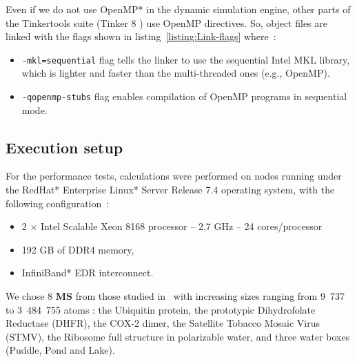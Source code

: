 \documentclass[9pt,comparison]{livecoms}
\newcommand{\lv}{\Large\verb}
\begin{document}
Even if we do not use OpenMP*\cite{openmp} in the dynamic simulation engine, other parts of the Tinkertools suite (Tinker 8 \cite{Tinker8})  use OpenMP directives. So, object files are linked with the flags shown in listing~\ref{listing:Link-flags} where~:
\begin{itemize}
    \item {\color{codepurple}\lv|-mkl=sequential|} flag tells the linker to use the sequential Intel MKL library, which is lighter and faster than the multi-threaded ones (e.g., OpenMP).
    \item {\color{codepurple}\lv|-qopenmp-stubs|} flag enables compilation of OpenMP programs in sequential mode. 
\end{itemize}


\subsection{Execution setup}
\hspace{\parindent}For the performance tests, calculations were performed on nodes running under the RedHat* Enterprise Linux* Server Release 7.4 operating system, with the following configuration~:
\begin{itemize}
    \item 2 $\times$ Intel Scalable Xeon 8168 processor -- 2,7 GHz -- 24 cores/processor
    \item 192 GB of DDR4 memory,
    \item InfiniBand* EDR interconnect.
\end{itemize}

We chose 8 \textbf{MS} from those studied in~\cite{Tinker-HP} with increasing sizes ranging from 9~737 to 3~484~755 atoms : the Ubiquitin protein, the prototypic Dihydrofolate Reductase (DHFR), the COX-2 dimer, the Satellite Tobacco Mosaic Virus (STMV), the Ribosome full structure in polarizable water, and three water boxes (Puddle, Pond and Lake). 
\end{document}
